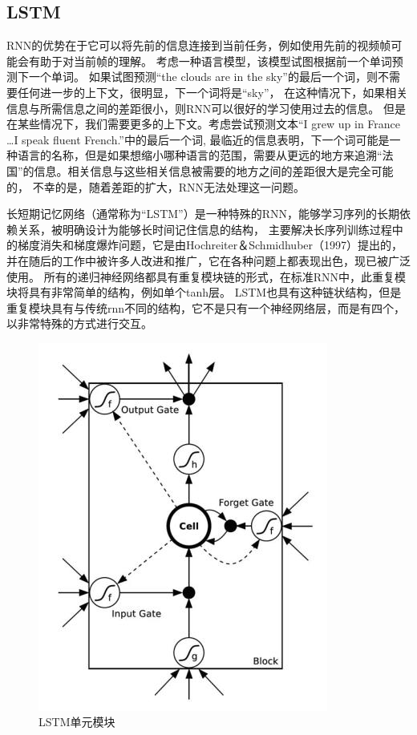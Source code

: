   
\subsection{LSTM}
  RNN的优势在于它可以将先前的信息连接到当前任务，例如使用先前的视频帧可能会有助于对当前帧的理解。
  考虑一种语言模型，该模型试图根据前一个单词预测下一个单词。
  如果试图预测“the clouds are in the sky”的最后一个词，则不需要任何进一步的上下文，很明显，下一个词将是“sky”，
  在这种情况下，如果相关信息与所需信息之间的差距很小，则RNN可以很好的学习使用过去的信息。
  但是在某些情况下，我们需要更多的上下文。考虑尝试预测文本“I grew up in France \dots I speak fluent French.”中的最后一个词,
  最临近的信息表明，下一个词可能是一种语言的名称，但是如果想缩小哪种语言的范围，需要从更远的地方来追溯“法国”的信息。相关信息与这些相关信息被需要的地方之间的差距很大是完全可能的，
不幸的是，随着差距的扩大，RNN无法处理这一问题。

长短期记忆网络（通常称为“LSTM”）是一种特殊的RNN，能够学习序列的长期依赖关系，被明确设计为能够长时间记住信息的结构，
主要解决长序列训练过程中的梯度消失和梯度爆炸问题，它是由Hochreiter＆Schmidhuber（1997）提出的，
并在随后的工作中被许多人改进和推广，它在各种问题上都表现出色，现已被广泛使用。
所有的递归神经网络都具有重复模块链的形式，在标准RNN中，此重复模块将具有非常简单的结构，例如单个tanh层。
LSTM也具有这种链状结构，但是重复模块具有与传统rnn不同的结构，它不是只有一个神经网络层，而是有四个，以非常特殊的方式进行交互。

\begin{figure}[htbp]
  \centering
  \includegraphics[scale=0.8]{./images/LSTM.jpg}
  \caption{LSTM单元模块\cite{sundermeyer2012lstm}}
  \label{fig:LSTM}
\end{figure}

